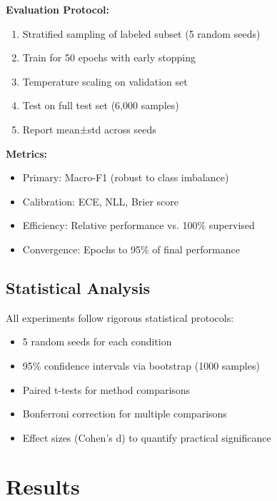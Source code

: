 \documentclass[journal]{IEEEtran}
\begin{document}
\textbf{Evaluation Protocol:}
\begin{enumerate}
\item Stratified sampling of labeled subset (5 random seeds)
\item Train for 50 epochs with early stopping
\item Temperature scaling on validation set
\item Test on full test set (6,000 samples)
\item Report mean±std across seeds
\end{enumerate}

\textbf{Metrics:}
\begin{itemize}
\item Primary: Macro-F1 (robust to class imbalance)
\item Calibration: ECE, NLL, Brier score
\item Efficiency: Relative performance vs. 100\% supervised
\item Convergence: Epochs to 95\% of final performance
\end{itemize}

\subsection{Statistical Analysis}
All experiments follow rigorous statistical protocols:
\begin{itemize}
\item 5 random seeds for each condition
\item 95\% confidence intervals via bootstrap (1000 samples)
\item Paired t-tests for method comparisons
\item Bonferroni correction for multiple comparisons
\item Effect sizes (Cohen's d) to quantify practical significance
\end{itemize}

\section{Results}
\end{document}
